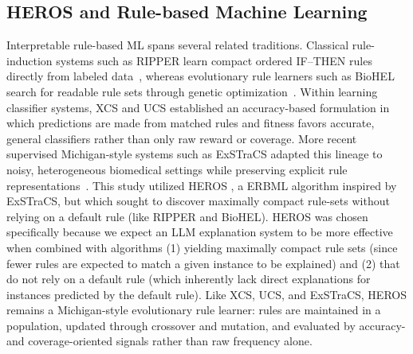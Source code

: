 \documentclass[sigconf]{acmart}
\begin{document}
\subsection{HEROS and Rule-based Machine Learning}
Interpretable rule-based ML spans several related traditions. Classical rule-induction systems such as RIPPER learn compact ordered IF--THEN rules directly from labeled data~\cite{cohen1995ripper}, whereas evolutionary rule learners such as BioHEL search for readable rule sets through genetic optimization~\cite{bacardit2006biohel}. Within learning classifier systems, XCS \cite{wilson2000xcs} and UCS \cite{bernado2003ucs} established an accuracy-based formulation in which predictions are made from matched rules and fitness favors accurate, general classifiers rather than only raw reward or coverage. More recent supervised Michigan-style systems such as ExSTraCS \cite{urbanowicz2015exstracs} adapted this lineage to noisy, heterogeneous biomedical settings while preserving explicit rule representations~\cite{urbanowicz2015exstracs,urbanowicz2017intro}. This study utilized HEROS \cite{lipschutzvilla2025heros}, a ERBML algorithm inspired by ExSTraCS, but which sought to discover maximally compact rule-sets without relying on a default rule (like RIPPER and BioHEL). HEROS was chosen specifically because we expect an LLM explanation system to be more effective when combined with algorithms (1) yielding maximally compact rule sets (since fewer rules are expected to match a given instance to be explained) and (2) that do not rely on a default rule (which inherently lack direct explanations for instances predicted by the default rule). Like XCS, UCS, and ExSTraCS, HEROS remains a Michigan-style evolutionary rule learner: rules are maintained in a population, updated through crossover and mutation, and evaluated by accuracy- and coverage-oriented signals rather than raw frequency alone. %
\end{document}
